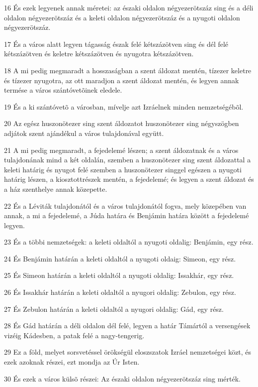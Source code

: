 \par 16 És ezek legyenek annak méretei: az északi oldalon négyezerötszáz sing és a déli oldalon négyezerötszáz és a keleti oldalon négyezerötszáz és a nyugoti oldalon négyezerötszáz.
\par 17 És a város alatt legyen tágasság észak felé kétszázötven sing és dél felé kétszázötven és keletre kétszázötven és nyugotra kétszázötven.
\par 18 A mi pedig megmaradt a hosszaságban a szent áldozat mentén, tízezer keletre és tízezer nyugotra, az ott maradjon a szent áldozat mentén, és legyen annak termése a város szántóvetõinek eledele.
\par 19 És a ki szántóvetõ a városban, mívelje azt Izráelnek minden nemzetségébõl.
\par 20 Az egész huszonötezer sing szent áldozatot huszonötezer sing négyszögben adjátok szent ajándékul a város tulajdonával együtt.
\par 21 A mi pedig megmaradt, a fejedelemé lészen; a szent áldozatnak és a város tulajdonának mind a két oldalán, szemben a huszonötezer sing szent áldozattal a keleti határig és nyugot felé szemben a huszonötezer singgel egészen a nyugoti határig lészen, a kiosztottrészek mentén, a fejedelemé; és legyen a szent áldozat és a ház szenthelye annak közepette.
\par 22 És a Léviták tulajdonától és a város tulajdonától fogva, mely közepében van annak, a mi a fejedelemé, a Júda határa és Benjámin határa között a fejedelemé legyen.
\par 23 És a többi nemzetségek: a keleti oldaltól a nyugoti oldalig: Benjámin, egy rész.
\par 24 És Benjámin határán a keleti oldaltól a nyugoti oldaig: Simeon, egy rész.
\par 25 És Simeon határán a keleti oldaltól a nyugoti oldalig: Issakhár, egy rész.
\par 26 És Issakhár határán a keleti oldaltól a nyugori oldalig: Zebulon, egy rész.
\par 27 És Zebulon határán a keleti oldaltól a nyugori oldalig: Gád, egy rész.
\par 28 És Gád határán a déli oldalon dél felé, legyen a határ Támártól a versengések vizéig Kádesben, a patak felé a nagy-tengerig.
\par 29 Ez a föld, melyet sorsvetéssel örökségül eloszszatok Izráel nemzetségei közt, és ezek azoknak részei, ezt mondja az Úr Isten.
\par 30 És ezek a város külsõ részei: Az északi oldalon négyezerötszáz sing mérték.
